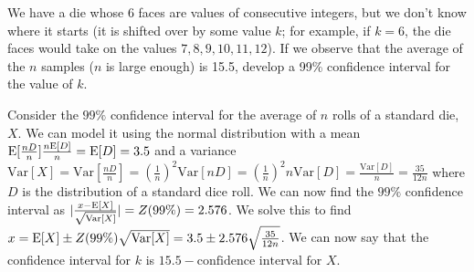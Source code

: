 \question We have a die whose 6 faces are values of consecutive integers, 
but we don’t know where it starts (it is shifted over by some value 
$k$; for example, if $k = 6$, the die faces would take on the values 
$7, 8, 9, 10, 11, 12$). If we observe that the average of the $n$ 
samples ($n$ is large enough) is 15.5, develop a 99\% confidence 
interval for the value of $k$.
\begin{solution}
  Consider the $99\%$ confidence interval for the average of $n$ rolls of a standard die, $X$. We can model it using the normal distribution with a mean $\text{E}[\frac{nD}{n}] \frac{n\text{E}[D]}{n} = \text{E}[D]= 3.5$ and a variance $\text{Var}[X] = \text{Var}[\frac{nD}{n}] = (\frac{1}{n})^2\text{Var}[nD] = (\frac{1}{n})^2n\text{Var}[D] = \frac{\text{Var}[D]}{n} = \frac{35}{12n}$ where $D$ is the distribution of a standard dice roll. We can now find the $99\%$ confidence interval as $|\frac{x - \text{E}[X]}{\sqrt{\text{Var}[X]}}| = Z(99\%) = 2.576$. We solve this to find $x = \text{E}[X] \pm Z(99\%)\sqrt{\text{Var}[X]} = 3.5 \pm 2.576\sqrt{\frac{35}{12n}}$. We can now say that the confidence interval for $k$ is $15.5 - \text{confidence interval for $X$}$.
\end{solution}
